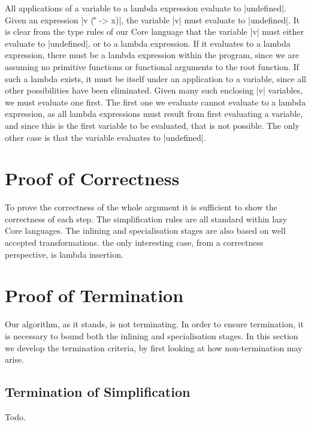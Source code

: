 \documentclass[preprint]{sigplanconf}
\begin{document}
\begin{lemma}{All applications of a variable to a lambda expression evaluate to |undefined|.}
Given an expression |v (\v' -> x)|, the variable |v| must evaluate to |undefined|. It is clear from the type rules of our Core language that the variable |v| must either evaluate to |undefined|, or to a lambda expression. If it evaluates to a lambda expression, there must be a lambda expression within the program, since we are assuming no primitive functions or functional arguments to the root function. If such a lambda exists, it must be itself under an application to a variable, since all other possibilities have been eliminated. Given many such enclosing |v| variables, we must evaluate one first. The first one we evaluate cannot evaluate to a lambda expression, as all lambda expressions must result from first evaluating a variable, and since this is the first variable to be evaluated, that is not possible. The only other case is that the variable evaluates to |undefined|.
\end{lemma}


\section{Proof of Correctness}

To prove the correctness of the whole argument it is sufficient to show the correctness of each step. The simplification rules are all standard within lazy Core languages. The inlining and specialisation stages are also based on well accepted transformations. the only interesting case, from a correctness perspective, is lambda insertion.


\section{Proof of Termination}
\label{sec:firstify_terminate}

Our algorithm, as it stands, is not terminating. In order to ensure termination, it is necessary to bound both the inlining and specialisation stages. In this section we develop the termination criteria, by first looking at how non-termination may arise.

\subsection{Termination of Simplification}

Todo.
\end{document}
